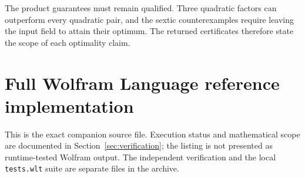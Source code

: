 \documentclass[11pt,letterpaper]{article}
\theoremstyle{definition}
\theoremstyle{remark}
\newcommand{\wl}[1]{\texttt{#1}}
\begin{document}
The product guarantees must remain qualified. Three quadratic factors can
outperform every quadratic pair, and the sextic counterexamples require
leaving the input field to attain their optimum. The returned certificates
therefore state the scope of each optimality claim.

\clearpage
\appendix
\section{Full Wolfram Language reference implementation}\label{app:code}
This is the exact companion source file. Execution status and mathematical
scope are documented in Section~\ref{sec:verification}; the listing is not
presented as runtime-tested Wolfram output. The independent verification and
the local \wl{tests.wlt} suite are separate files in the archive.

\end{document}
